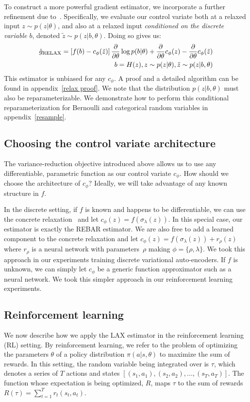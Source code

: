 \documentclass{article}
\newcommand{\PT}{\frac{\partial}{\partial \theta}}
\newcommand{\LAX}{{\textnormal{LAX}}}
\begin{document}
To construct a more powerful gradient estimator, we incorporate a further refinement due to~\cite{tucker2017rebar}.
Specifically, we evaluate our control variate both at a relaxed input $z \sim p(z|\theta)$, and also at a relaxed input \emph{conditioned on the discrete variable $b$}, denoted $\tilde z \sim p(z|b, \theta)$. 
Doing so gives us:
%
\begin{align}
\hat g_\textnormal{RELAX} = \left[ f(b) - c_\phi(\tilde{z}) \right] \PT \log p(b|\theta) + \PT c_\phi(z) - \PT c_\phi (\tilde{z}) \\
\qquad b = H(z), z \sim p(z|\theta), \tilde{z} \sim p(z|b, \theta) \nonumber
\end{align}
%
This estimator is unbiased for any $c_\phi$.
A proof and a detailed algorithm can be found in appendix~\ref{relax proof}.
%
We note that the distribution $p(z|b,\theta)$ must also be reparameterizable.
We demonstrate how to perform this conditional reparameterization for Bernoulli and categorical random variables in appendix~\ref{resample}.

\subsection{Choosing the control variate architecture}
The variance-reduction objective introduced above allows us to use any differentiable, parametric function as our control variate $c_\phi$. 
How should we choose the architecture of $c_\phi$?
Ideally, we will take advantage of any known structure in $f$.

In the discrete setting, if $f$ is known and happens to be differentiable, we can use the concrete relaxation~\citep{jang2016categorical, maddison2016concrete} and let $c_\phi(z) = f(\sigma_\lambda(z))$.
In this special case, our estimator is exactly the REBAR estimator.
We are also free to add a learned component to the concrete relaxation and let $c_\phi(z) = f(\sigma_\lambda(z)) + {r}_\rho(z)$ where ${r}_\rho$ is a neural network with parameters~$\rho$ making $\phi = \{\rho, \lambda\}$.
We took this approach in our experiments training discrete variational auto-encoders.
If $f$ is unknown, we can simply let $c_\phi$ be a generic function approximator such as a neural network.
We took this simpler approach in our reinforcement learning experiments.


\subsection{Reinforcement learning}
We now describe how we apply the \LAX{} estimator in the reinforcement learning (RL) setting.
By reinforcement learning, we refer to the problem of optimizing the parameters $\theta$ of a policy distribution $\pi(a | s, \theta)$ to maximize the sum of rewards.
In this setting, the random variable being integrated over is $\tau$, which denotes a series of $T$ actions and states $[(s_1, a_1), (s_2, a_2), ..., (s_T, a_T)]$.
The function whose expectation is being optimized, $R$, maps $\tau$ to the sum of rewards ${R(\tau) = \sum_{t=1}^{T} r_t(s_t, a_t)}$.
\end{document}
